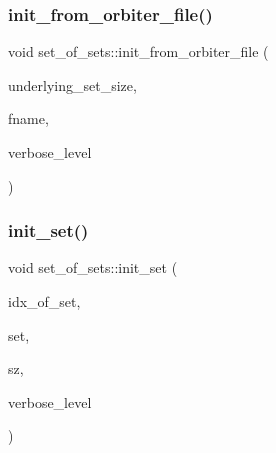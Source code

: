 \mbox{\label{classset__of__sets_a0659335f54a3b9109b4986483b53470b}} 
\subsubsection{\texorpdfstring{init\+\_\+from\+\_\+orbiter\+\_\+file()}{init\_from\_orbiter\_file()}}
{\footnotesize\ttfamily void set\+\_\+of\+\_\+sets\+::init\+\_\+from\+\_\+orbiter\+\_\+file (\begin{DoxyParamCaption}\item[{\mbox{\hyperlink{galois_8h_a09fddde158a3a20bd2dcadb609de11dc}{I\+NT}}}]{underlying\+\_\+set\+\_\+size,  }\item[{const \mbox{\hyperlink{galois_8h_ab6cc7b4aeb6ea31aba2b3fbfc83ff5e6}{B\+Y\+TE}} $\ast$}]{fname,  }\item[{\mbox{\hyperlink{galois_8h_a09fddde158a3a20bd2dcadb609de11dc}{I\+NT}}}]{verbose\+\_\+level }\end{DoxyParamCaption})}

\mbox{\label{classset__of__sets_a2a0f2c45614a495e4d1f06fd23410279}} 
\subsubsection{\texorpdfstring{init\+\_\+set()}{init\_set()}}
{\footnotesize\ttfamily void set\+\_\+of\+\_\+sets\+::init\+\_\+set (\begin{DoxyParamCaption}\item[{\mbox{\hyperlink{galois_8h_a09fddde158a3a20bd2dcadb609de11dc}{I\+NT}}}]{idx\+\_\+of\+\_\+set,  }\item[{\mbox{\hyperlink{galois_8h_a09fddde158a3a20bd2dcadb609de11dc}{I\+NT}} $\ast$}]{set,  }\item[{\mbox{\hyperlink{galois_8h_a09fddde158a3a20bd2dcadb609de11dc}{I\+NT}}}]{sz,  }\item[{\mbox{\hyperlink{galois_8h_a09fddde158a3a20bd2dcadb609de11dc}{I\+NT}}}]{verbose\+\_\+level }\end{DoxyParamCaption})}

